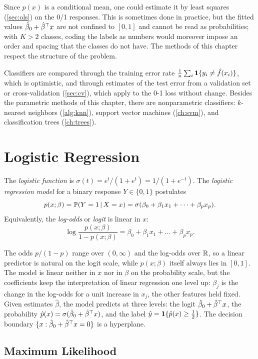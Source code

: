 Since $p(x)$ is a conditional mean, one could estimate it by least squares (\cref{sec:ols}) on the 0/1 responses. This is sometimes done in practice, but the fitted values $\hat\beta_0+\hat\beta^{\top} x$ are not confined to $[0,1]$ and cannot be read as probabilities; with $K>2$ classes, coding the labels as numbers would moreover impose an order and spacing that the classes do not have. The methods of this chapter respect the structure of the problem.

Classifiers are compared through the training error rate $\frac1n\sum_i\mathbf{1}\{y_i\ne\hat f(x_i)\}$, which is optimistic, and through estimates of the test error from a validation set or cross-validation (\cref{sec:cv}), which apply to the 0-1 loss without change. Besides the parametric methods of this chapter, there are nonparametric classifiers: $k$-nearest neighbors (\cref{alg:knn}), support vector machines (\cref{ch:svm}), and classification trees (\cref{ch:trees}).

\section{Logistic Regression}\label{sec:logistic}

\begin{definition}
The \emph{logistic function} is $\sigma(t)=e^t/(1+e^t)=1/(1+e^{-t})$. The \emph{logistic regression model} for a binary response $Y\in\{0,1\}$ postulates
\[
p(x;\beta)=\mathbb{P}(Y=1\,|\, X=x)=\sigma(\beta_0+\beta_1x_1+\dots+\beta_px_p).
\]
Equivalently, the \emph{log-odds} or \emph{logit} is linear in $x$:
\[
\log\frac{p(x;\beta)}{1-p(x;\beta)}=\beta_0+\beta_1x_1+\dots+\beta_px_p.
\]
\end{definition}

The odds $p/(1-p)$ range over $(0,\infty)$ and the log-odds over $\mathbb{R}$, so a linear predictor is natural on the logit scale, while $p(x;\beta)$ itself always lies in $[0,1]$. The model is linear neither in $x$ nor in $\beta$ on the probability scale, but the coefficients keep the interpretation of linear regression one level up: $\beta_j$ is the change in the log-odds for a unit increase in $x_j$, the other features held fixed. Given estimates $\hat\beta$, the model predicts at three levels: the logit $\hat\beta_0+\hat\beta^{\top} x$, the probability $\hat p(x)=\sigma(\hat\beta_0+\hat\beta^{\top} x)$, and the label $\hat y=\mathbf{1}\{\hat p(x)\ge\frac12\}$. The decision boundary $\{x:\hat\beta_0+\hat\beta^{\top} x=0\}$ is a hyperplane.

\subsection{Maximum Likelihood}

